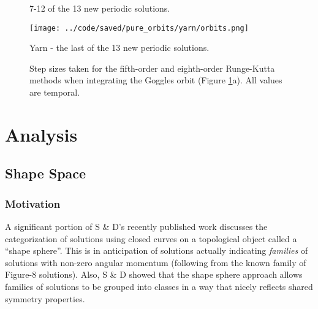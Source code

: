 \documentclass[12pt]{article}
\begin{document}
\begin{figure}
 \qquad
{} \qquad
{} \qquad
{} \qquad
{} \qquad
{} \qquad
\caption{7-12 of the 13 new periodic solutions.}
\label{f3}
\end{figure}

\begin{figure}
\center
\texttt{[image: ../code/saved/pure\_orbits/yarn/orbits.png]}
\caption{Yarn - the last of the 13 new periodic solutions.}
\label{f4}
\end{figure}

\begin{figure}
 \qquad
{} \qquad
\caption{Step sizes taken for the fifth-order and eighth-order Runge-Kutta methods when integrating the Goggles orbit (Figure \ref{f3}a). All values are temporal.}
\label{f5}
\end{figure}

\section{Analysis}
\subsection{Shape Space}
\subsubsection{Motivation}
A significant portion of S \& D's recently published work \cite{suv} discusses the categorization of solutions using closed curves on a topological object called a ``shape sphere''. This is in anticipation of solutions actually indicating \emph{families} of solutions with non-zero angular momentum (following from the known family of Figure-8 solutions). Also, S \& D showed that the shape sphere approach allows families of solutions to be grouped into classes in a way that nicely reflects shared symmetry properties.
\end{document}
